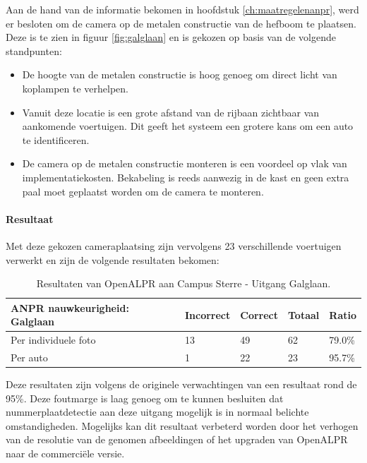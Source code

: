 Aan de hand van de informatie bekomen in hoofdstuk \ref{ch:maatregelenanpr}, werd er besloten om de camera op de metalen constructie van de hefboom te plaatsen. Deze is te zien in figuur \ref{fig:galglaan} en is gekozen op basis van de volgende standpunten:
\begin{itemize}
	\item De hoogte van de metalen constructie is hoog genoeg om direct licht van koplampen te verhelpen.
	\item Vanuit deze locatie is een grote afstand van de rijbaan zichtbaar van aankomende voertuigen. Dit geeft het systeem een grotere kans om een auto te identificeren.
	\item De camera op de metalen constructie monteren is een voordeel op vlak van implementatiekosten. Bekabeling is reeds aanwezig in de kast en geen extra paal moet geplaatst worden om de camera te monteren.
\end{itemize}

\paragraph{Resultaat}
Met deze gekozen cameraplaatsing zijn vervolgens 23 verschillende voertuigen verwerkt en zijn de volgende resultaten bekomen:
\begin{table}[h!]
	\centering
	\begin{tabular}{l|l|l|l|l}
\textbf{ANPR nauwkeurigheid: Galglaan} & Incorrect & Correct & Totaal & Ratio	\\ \hline
Per individuele foto 	& 13 & 49	& 62	& 79.0\%\\
Per auto				& 1 & 22	& 23 	& 95.7\%\\
\end{tabular}
\caption{Resultaten van OpenALPR aan Campus Sterre - Uitgang Galglaan.}
\label{tab:anprgalglaan}
\end{table}

Deze resultaten zijn volgens de originele verwachtingen van een resultaat rond de 95\%. Deze foutmarge is laag genoeg om te kunnen besluiten dat nummerplaatdetectie aan deze uitgang mogelijk is in normaal belichte omstandigheden. Mogelijks kan dit resultaat verbeterd worden door het verhogen van de resolutie van de genomen afbeeldingen of het upgraden van OpenALPR naar de commerciële versie.

